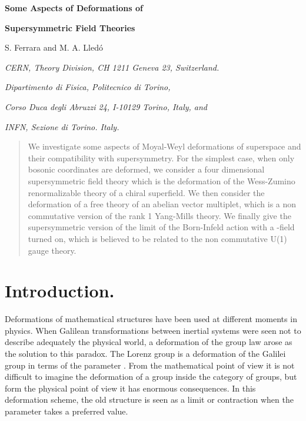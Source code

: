 \documentclass[a4paper,12pt]{article}
\begin{document}
\providecommand{\R}{{\bf R}}
\providecommand{\C}{{\bf C}}
\providecommand{\Z}{{\bf Z}}



\vskip 2.5cm

  \centerline{\Large \bf Some Aspects of Deformations of}
\bigskip
\centerline {\Large\bf  Supersymmetric Field Theories}

\vskip 2.5cm

\centerline{S. Ferrara\myHighlight{$^*$}\coordHE{} and M. A. Lled\'o\myHighlight{$^\dagger$}\coordHE{}}
\bigskip
\bigskip

\centerline{\it \myHighlight{$^*$}\coordHE{} CERN, Theory Division, CH 1211 Geneva 23,
Switzerland.} 
\bigskip
\centerline{\it \myHighlight{$^\dagger$}\coordHE{} Dipartimento di Fisica, Politecnico di Torino,}
\centerline{\it Corso Duca degli Abruzzi 24, I-10129 Torino, Italy, and}
\centerline{\it INFN, Sezione di Torino. Italy.}
\vskip 2cm
\begin{abstract}
  We investigate some aspects of Moyal-Weyl deformations of superspace and
their compatibility
 with supersymmetry. For the simplest case, when only bosonic coordinates
are deformed,
we consider a four dimensional supersymmetric field theory which is the
deformation of the 
Wess-Zumino renormalizable theory of a chiral superfield. We then consider
the deformation of 
a free theory of  an abelian vector multiplet, which is a non commutative
version of the rank 1 
Yang-Mills theory.  We finally  give the supersymmetric version of the 
\coordHE{} limit of the Born-Infeld action with a \coordHE{}-field
turned on,
 which is believed to be related to the  non commutative U(1) gauge
theory.

\end{abstract}



\vfill\eject
\section{Introduction.}

Deformations of mathematical structures have been used at different
moments in physics. 
When Galilean transformations between inertial systems were seen not to 
describe adequately the physical world, a deformation of the group law
 arose as the solution to this paradox. The Lorenz group
 is a deformation of the Galilei group in terms of the parameter
\coordHE{}. From the
mathematical point of view it is not difficult to imagine the deformation
of a group
inside the category of groups, but form the physical point of view it has
enormous
consequences. In this deformation scheme, the old structure is seen as a
limit or 
contraction when the parameter takes a preferred value.
\end{document}

